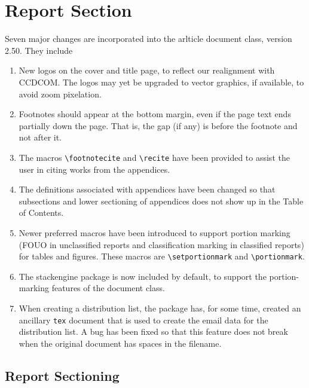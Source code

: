 \documentclass{arlticle}
\begin{document}
\ARLcover{
}%
\arltitlepage

\tableofcontents
\clearpage

\section{Report Section}

Seven major changes are incorporated into the \textsf{arlticle} document
  class, version 2.50.
They include
\begin{enumerate}
\item New logos on the cover and title page, to reflect our realignment
  with CCDCOM.  The logos may yet be upgraded to vector graphics, if
  available, to avoid zoom pixelation.

\item Footnotes should appear at the bottom margin, even if the page text 
  ends partially down the page.  That is, the gap (if any) is before the
  footnote and not after it.

\item The macros \verb|\footnotecite| and \verb|\recite| have been
  provided to assist the user in citing works from the appendices.

\item The definitions associated with appendices have been changed
  so that subsections and lower sectioning of appendices does not
  show up in the Table of Contents.

\item Newer preferred macros have been introduced to  support
  portion marking (FOUO in unclassified reports and classification
  marking in classified reports) for tables and figures.
  These macros are \verb|\setportionmark| and \verb|\portionmark|.

\item The \textsf{stackengine} package is now included by default,
  to support the portion-marking features of the document class.

\item When creating a distribution list, the package has, for some time,
  created an ancillary \verb|tex| document that is used to create the
  email data for the distribution list.
  A bug has been fixed so that this feature does not break when the 
  original document has spaces in the filename.
\end{enumerate}

\subsection{Report Sectioning}
\end{document}
